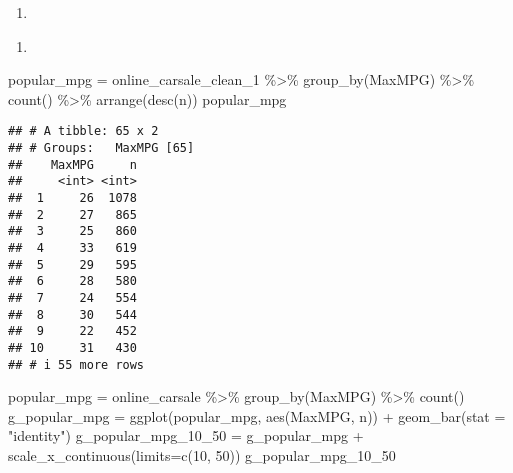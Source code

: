 \documentclass[
]{article}
\newenvironment{Shaded}{\begin{snugshade}}{\end{snugshade}}
\newcommand{\AttributeTok}[1]{\textcolor[rgb]{0.77,0.63,0.00}{#1}}
\newcommand{\DecValTok}[1]{\textcolor[rgb]{0.00,0.00,0.81}{#1}}
\newcommand{\FunctionTok}[1]{\textcolor[rgb]{0.00,0.00,0.00}{#1}}
\newcommand{\NormalTok}[1]{#1}
\newcommand{\OtherTok}[1]{\textcolor[rgb]{0.56,0.35,0.01}{#1}}
\newcommand{\SpecialCharTok}[1]{\textcolor[rgb]{0.00,0.00,0.00}{#1}}
\newcommand{\StringTok}[1]{\textcolor[rgb]{0.31,0.60,0.02}{#1}}
\providecommand{\tightlist}{%
  \setlength{\itemsep}{0pt}\setlength{\parskip}{0pt}}
\begin{document}
\begin{enumerate}
\def\labelenumi{\arabic{enumi}.}
\setcounter{enumi}{2}
\tightlist
\item
\end{enumerate}

\begin{Shaded}
\end{Shaded}

\begin{enumerate}
\def\labelenumi{\arabic{enumi}.}
\setcounter{enumi}{3}
\tightlist
\item
\end{enumerate}

\begin{Shaded}
\begin{Highlighting}[]
\NormalTok{popular\_mpg }\OtherTok{=}\NormalTok{ online\_carsale\_clean\_1 }\SpecialCharTok{\%\textgreater{}\%} \FunctionTok{group\_by}\NormalTok{(MaxMPG) }\SpecialCharTok{\%\textgreater{}\%} \FunctionTok{count}\NormalTok{() }\SpecialCharTok{\%\textgreater{}\%} \FunctionTok{arrange}\NormalTok{(}\FunctionTok{desc}\NormalTok{(n))}
\NormalTok{popular\_mpg}
\end{Highlighting}
\end{Shaded}

\begin{verbatim}
## # A tibble: 65 x 2
## # Groups:   MaxMPG [65]
##    MaxMPG     n
##     <int> <int>
##  1     26  1078
##  2     27   865
##  3     25   860
##  4     33   619
##  5     29   595
##  6     28   580
##  7     24   554
##  8     30   544
##  9     22   452
## 10     31   430
## # i 55 more rows
\end{verbatim}

\begin{Shaded}
\begin{Highlighting}[]
\NormalTok{popular\_mpg }\OtherTok{=}\NormalTok{ online\_carsale }\SpecialCharTok{\%\textgreater{}\%} \FunctionTok{group\_by}\NormalTok{(MaxMPG) }\SpecialCharTok{\%\textgreater{}\%} \FunctionTok{count}\NormalTok{()}
\NormalTok{g\_popular\_mpg }\OtherTok{=} \FunctionTok{ggplot}\NormalTok{(popular\_mpg, }\FunctionTok{aes}\NormalTok{(MaxMPG, n)) }\SpecialCharTok{+} \FunctionTok{geom\_bar}\NormalTok{(}\AttributeTok{stat =} \StringTok{"identity"}\NormalTok{)}
\NormalTok{g\_popular\_mpg\_10\_50 }\OtherTok{=}\NormalTok{ g\_popular\_mpg }\SpecialCharTok{+} \FunctionTok{scale\_x\_continuous}\NormalTok{(}\AttributeTok{limits=}\FunctionTok{c}\NormalTok{(}\DecValTok{10}\NormalTok{, }\DecValTok{50}\NormalTok{))}
\NormalTok{g\_popular\_mpg\_10\_50}
\end{Highlighting}
\end{Shaded}
\end{document}
